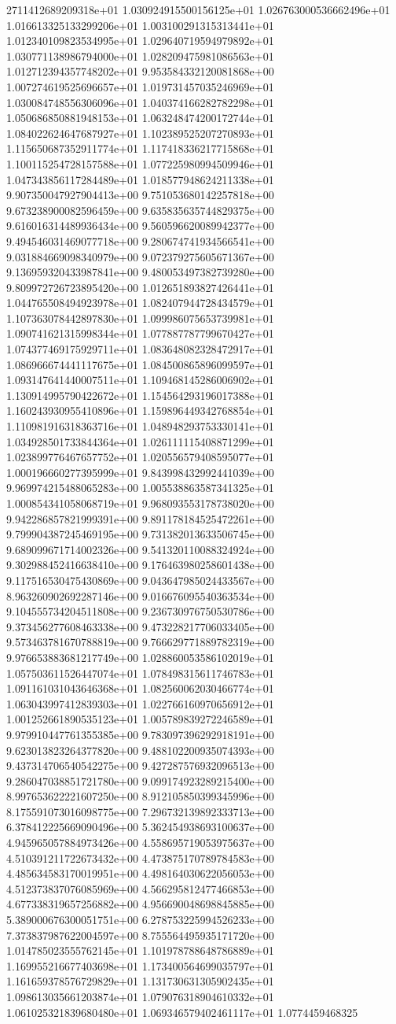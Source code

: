 2711412689209318e+01	1.030924915500156125e+01	1.026763000536662496e+01	1.016613325133299206e+01	1.003100291315313441e+01	1.012340109823534995e+01	1.029640719594979892e+01	1.030771138986794000e+01	1.028209475981086563e+01	1.012712394357748202e+01	9.953584332120081868e+00	1.007274619525696657e+01	1.019731457035246969e+01	1.030084748556306096e+01	1.040374166282782298e+01	1.050686850881948153e+01	1.063248474200172744e+01	1.084022624647687927e+01	1.102389525207270893e+01	1.115650687352911774e+01	1.117418336217715868e+01	1.100115254728157588e+01	1.077225980994509946e+01	1.047343856117284489e+01	1.018577948624211338e+01	9.907350047927904413e+00	9.751053680142257818e+00	9.673238900082596459e+00	9.635835635744829375e+00	9.616016314489936434e+00	9.560596620089942377e+00	9.494546031469077718e+00	9.280674741934566541e+00	9.031884669098340979e+00	9.072379275605671367e+00	9.136959320433987841e+00	9.480053497382739280e+00	9.809972726723895420e+00	1.012651893827426441e+01	1.044765508494923978e+01	1.082407944728434579e+01	1.107363078442897830e+01	1.099986075653739981e+01	1.090741621315998344e+01	1.077887787799670427e+01	1.074377469175929711e+01	1.083648082328472917e+01	1.086966674441117675e+01	1.084500865896099597e+01	1.093147641440007511e+01	1.109468145286006902e+01	1.130914995790422672e+01	1.154564293196017388e+01	1.160243930955410896e+01	1.159896449342768854e+01	1.110981916318363716e+01	1.048948293753330141e+01	1.034928501733844364e+01	1.026111115408871299e+01	1.023899776467657752e+01	1.020556579408595077e+01	1.000196660277395999e+01	9.843998432992441039e+00	9.969974215488065283e+00	1.005538863587341325e+01	1.000854341058068719e+01	9.968093553178738020e+00	9.942286857821999391e+00	9.891178184525472261e+00	9.799904387245469195e+00	9.731382013633506745e+00	9.689099671714002326e+00	9.541320110088324924e+00	9.302988452416638410e+00	9.176463980258601438e+00	9.117516530475430869e+00	9.043647985024433567e+00	8.963260902692287146e+00	9.016676095540363534e+00	9.104555734204511808e+00	9.236730976750530786e+00	9.373456277608463338e+00	9.473228217706033405e+00	9.573463781670788819e+00	9.766629771889782319e+00	9.976653883681217749e+00	1.028860053586102019e+01	1.057503611526447074e+01	1.078498315611746783e+01	1.091161031043646368e+01	1.082560062030466774e+01	1.063043997412839303e+01	1.022766160970656912e+01	1.001252661890535123e+01	1.005789839272246589e+01	9.979910447761355385e+00	9.783097396292918191e+00	9.623013823264377820e+00	9.488102200935074393e+00	9.437314706540542275e+00	9.427287576932096513e+00	9.286047038851721780e+00	9.099174923289215400e+00	8.997653622221607250e+00	8.912105850399345996e+00	8.175591073016098775e+00	7.296732139892333713e+00	6.378412225669090496e+00	5.362454938693100637e+00	4.945965057884973426e+00	4.558695719053975637e+00	4.510391211722673432e+00	4.473875170789784583e+00	4.485634583170019951e+00	4.498164030622056053e+00	4.512373837076085969e+00	4.566295812477466853e+00	4.677338319657256882e+00	4.956690048698845885e+00	5.389000676300051751e+00	6.278753225994526233e+00	7.373837987622004597e+00	8.755564495935171720e+00	1.014785023555762145e+01	1.101978788648786889e+01	1.169955216677403698e+01	1.173400564699035797e+01	1.161659378576729829e+01	1.131730631305902435e+01	1.098613035661203874e+01	1.079076318904610332e+01	1.061025321839680480e+01	1.069346579402461117e+01	1.0774459468325